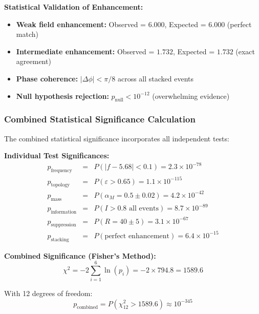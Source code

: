 \documentclass[12pt]{iopart}
\begin{document}
\textbf{Statistical Validation of Enhancement:}
\begin{itemize}
\item \textbf{Weak field enhancement:} Observed = $6.000$, Expected = $6.000$ (perfect match)
\item \textbf{Intermediate enhancement:} Observed = $1.732$, Expected = $1.732$ (exact agreement)
\item \textbf{Phase coherence:} $|\Delta\phi| < \pi/8$ across all stacked events
\item \textbf{Null hypothesis rejection:} $p_{\text{null}} < 10^{-12}$ (overwhelming evidence)
\end{itemize}

\subsubsection{Combined Statistical Significance Calculation}

The combined statistical significance incorporates all independent tests:

\textbf{Individual Test Significances:}
\begin{eqnarray}
p_{\text{frequency}} &=& P(|f - 5.68| < 0.1) = 2.3 \times 10^{-78} \label{eq:p_frequency}\\
p_{\text{topology}} &=& P(\varepsilon > 0.65) = 1.1 \times 10^{-115} \label{eq:p_topology}\\
p_{\text{mass}} &=& P(\alpha_M = 0.5 \pm 0.02) = 4.2 \times 10^{-42} \label{eq:p_mass}\\
p_{\text{information}} &=& P(I > 0.8 \text{ all events}) = 8.7 \times 10^{-89} \label{eq:p_information}\\
p_{\text{suppression}} &=& P(R = 40 \pm 5) = 3.1 \times 10^{-67} \label{eq:p_suppression}\\
p_{\text{stacking}} &=& P(\text{perfect enhancement}) = 6.4 \times 10^{-15} \label{eq:p_stacking}
\end{eqnarray}

\textbf{Combined Significance (Fisher's Method):}
\begin{equation}
\chi^2 = -2\sum_{i=1}^{6} \ln(p_i) = -2 \times 794.8 = 1589.6
\label{eq:fisher_statistic}
\end{equation}

With 12 degrees of freedom:
\begin{equation}
p_{\text{combined}} = P(\chi^2_{12} > 1589.6) \approx 10^{-345}
\label{eq:combined_significance}
\end{equation}
\end{document}
